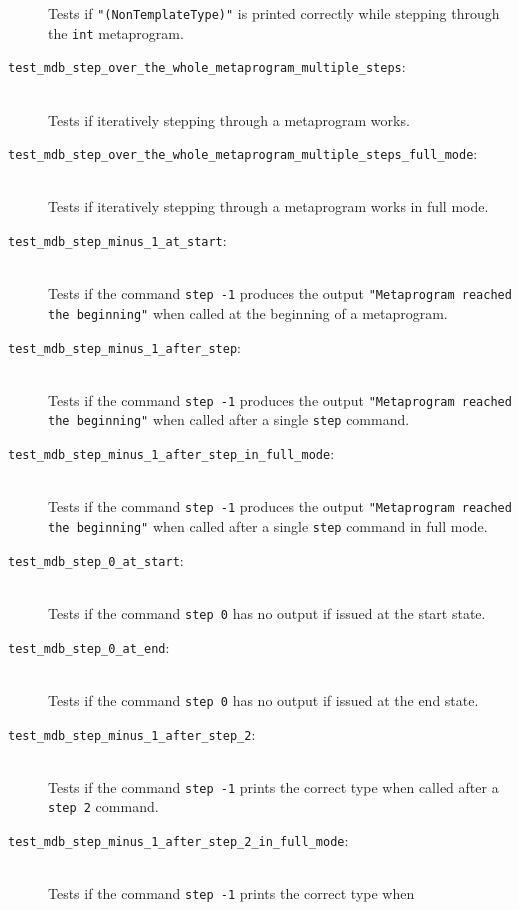 \begin{description}
        Tests if \texttt{"(NonTemplateType)"} is printed correctly while
        stepping through the \texttt{int} metaprogram.
    \item[\texttt{test\_mdb\_step\_over\_the\_whole\_metaprogram\_multiple\_steps}:] \hfill \\
        Tests if iteratively stepping through a metaprogram works.
    \item[\texttt{test\_mdb\_step\_over\_the\_whole\_metaprogram\_multiple\_steps\_full\_mode}:] \hfill \\
        Tests if iteratively stepping through a metaprogram works in full
        mode.
    \item[\texttt{test\_mdb\_step\_minus\_1\_at\_start}:] \hfill \\
        Tests if the command \texttt{step -1} produces the output
        \texttt{"Metaprogram reached the beginning"} when called at the
        beginning of a metaprogram.
    \item[\texttt{test\_mdb\_step\_minus\_1\_after\_step}:] \hfill \\
        Tests if the command \texttt{step -1} produces the output
        \texttt{"Metaprogram reached the beginning"} when called after a single
        \texttt{step} command.
    \item[\texttt{test\_mdb\_step\_minus\_1\_after\_step\_in\_full\_mode}:] \hfill \\
        Tests if the command \texttt{step -1} produces the output
        \texttt{"Metaprogram reached the beginning"} when called after a single
        \texttt{step} command in full mode.
    \item[\texttt{test\_mdb\_step\_0\_at\_start}:] \hfill \\
        Tests if the command \texttt{step 0} has no output if issued at the
        start state.
    \item[\texttt{test\_mdb\_step\_0\_at\_end}:] \hfill \\
        Tests if the command \texttt{step 0} has no output if issued at the
        end state.
    \item[\texttt{test\_mdb\_step\_minus\_1\_after\_step\_2}:] \hfill \\
        Tests if the command \texttt{step -1} prints the correct type when
        called after a \texttt{step 2} command.
    \item[\texttt{test\_mdb\_step\_minus\_1\_after\_step\_2\_in\_full\_mode}:] \hfill \\
        Tests if the command \texttt{step -1} prints the correct type when

\end{description}
